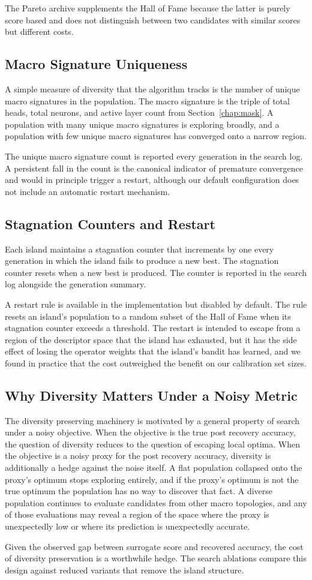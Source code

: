 The Pareto archive supplements the Hall of Fame because the latter is purely score based and does not distinguish between two candidates with similar scores but different costs.

\subsection{Macro Signature Uniqueness}

A simple measure of diversity that the algorithm tracks is the number of unique macro signatures in the population. The macro signature is the triple of total heads, total neurons, and active layer count from Section~\ref{chap:mask}. A population with many unique macro signatures is exploring broadly, and a population with few unique macro signatures has converged onto a narrow region.

The unique macro signature count is reported every generation in the search log. A persistent fall in the count is the canonical indicator of premature convergence and would in principle trigger a restart, although our default configuration does not include an automatic restart mechanism.

\subsection{Stagnation Counters and Restart}

Each island maintains a stagnation counter that increments by one every generation in which the island fails to produce a new best. The stagnation counter resets when a new best is produced. The counter is reported in the search log alongside the generation summary.

A restart rule is available in the implementation but disabled by default. The rule resets an island's population to a random subset of the Hall of Fame when its stagnation counter exceeds a threshold. The restart is intended to escape from a region of the descriptor space that the island has exhausted, but it has the side effect of losing the operator weights that the island's bandit has learned, and we found in practice that the cost outweighed the benefit on our calibration set sizes.

\subsection{Why Diversity Matters Under a Noisy Metric}

The diversity preserving machinery is motivated by a general property of search under a noisy objective. When the objective is the true post recovery accuracy, the question of diversity reduces to the question of escaping local optima. When the objective is a noisy proxy for the post recovery accuracy, diversity is additionally a hedge against the noise itself. A flat population collapsed onto the proxy's optimum stops exploring entirely, and if the proxy's optimum is not the true optimum the population has no way to discover that fact. A diverse population continues to evaluate candidates from other macro topologies, and any of those evaluations may reveal a region of the space where the proxy is unexpectedly low or where its prediction is unexpectedly accurate.

Given the observed gap between surrogate score and recovered accuracy, the cost of diversity preservation is a worthwhile hedge. The search ablations compare this design against reduced variants that remove the island structure.
